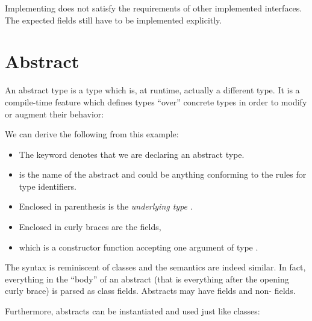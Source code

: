 \documentclass{haxe}
\begin{document}
Implementing  does not satisfy the requirements of other implemented interfaces. The expected fields still have to be implemented explicitly.





\section{Abstract}
\label{types-abstract}


An abstract type is a type which is, at runtime, actually a different type. It is a compile-time feature which defines types ``over'' concrete types in order to modify or augment their behavior:

We can derive the following from this example:

\begin{itemize}
	\item The keyword  denotes that we are declaring an abstract type.
	\item {} is the name of the abstract and could be anything conforming to the rules for type identifiers.
	\item Enclosed in parenthesis \expr{()} is the \emph{underlying type} .
	\item Enclosed in curly braces \expr{$\left\{\right\}$} are the fields,
	\item which is a constructor function  accepting one argument  of type .
\end{itemize}


The syntax is reminiscent of classes and the semantics are indeed similar. In fact, everything in the ``body'' of an abstract (that is everything after the opening curly brace) is parsed as class fields. Abstracts may have  fields and non-  fields.

Furthermore, abstracts can be instantiated and used just like classes:
\end{document}
